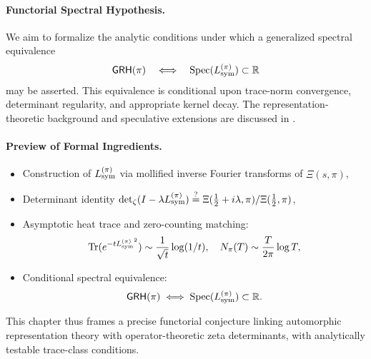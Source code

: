 \paragraph{Functorial Spectral Hypothesis.}
We aim to formalize the analytic conditions under which a generalized spectral equivalence
\[
\mathsf{GRH}(\pi) \quad \Longleftrightarrow \quad \operatorname{Spec}({L_{\mathrm{sym}}^{(\pi)}}) \subset \mathbb{R}
\]
may be asserted. This equivalence is conditional upon trace-norm convergence, determinant regularity, and appropriate kernel decay. The representation-theoretic background and speculative extensions are discussed in .

\paragraph{Preview of Formal Ingredients.}
\begin{itemize}
  \item Construction of \( {L_{\mathrm{sym}}^{(\pi)}} \) via mollified inverse Fourier transforms of \( \Xi(s, \pi) \),
  \item Determinant identity \( \det\nolimits_{\zeta}(I - \lambda {L_{\mathrm{sym}}^{(\pi)}}) \overset{?}{=} \Xi(\tfrac{1}{2} + i\lambda, \pi) / \Xi(\tfrac{1}{2}, \pi) \),
  \item Asymptotic heat trace and zero-counting matching:
  \[
  \operatorname{Tr}(e^{-t {L_{\mathrm{sym}}^{(\pi)}}^2}) \sim \frac{1}{\sqrt{t}} \log(1/t), \quad
  N_\pi(T) \sim \frac{T}{2\pi} \log T,
  \]
  \item Conditional spectral equivalence:
  \[
  \mathsf{GRH}(\pi) \iff \operatorname{Spec}({L_{\mathrm{sym}}^{(\pi)}}) \subset \mathbb{R}.
  \]
\end{itemize}

This chapter thus frames a precise functorial conjecture linking automorphic representation theory with operator-theoretic zeta determinants, with analytically testable trace-class conditions.
